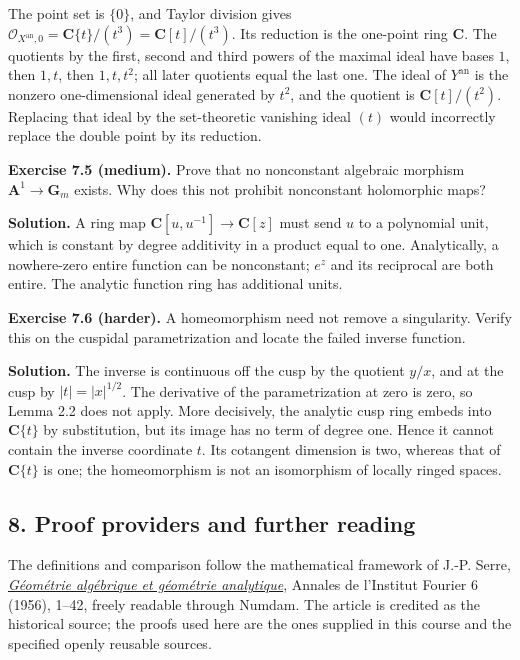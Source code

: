 \documentclass[11pt]{article}
\begin{document}
The point set is \(\{0\}\), and Taylor division gives
\(\mathcal O_{X^{\mathrm{an}},0}=\mathbf C\{t\}/(t^3)=\mathbf C[t]/(t^3)\).
Its reduction is the one-point ring \(\mathbf C\). The quotients by the
first, second and third powers of the maximal ideal have bases \(1\),
then \(1,t\), then \(1,t,t^2\); all later quotients equal the last one.
The ideal of \(Y^{\mathrm{an}}\) is the nonzero one-dimensional ideal
generated by \(t^2\), and the quotient is \(\mathbf C[t]/(t^2)\).
Replacing that ideal by the set-theoretic vanishing ideal \((t)\) would
incorrectly replace the double point by its reduction.

\textbf{Exercise 7.5 (medium).} Prove that no nonconstant algebraic
morphism \(\mathbf A^1\to\mathbf G_m\) exists. Why does this not
prohibit nonconstant holomorphic maps?

\textbf{Solution.} A ring map \(\mathbf C[u,u^{-1}]\to\mathbf C[z]\)
must send \(u\) to a polynomial unit, which is constant by degree
additivity in a product equal to one. Analytically, a nowhere-zero
entire function can be nonconstant; \(e^z\) and its reciprocal are both
entire. The analytic function ring has additional units.

\textbf{Exercise 7.6 (harder).} A homeomorphism need not remove a
singularity. Verify this on the cuspidal parametrization and locate the
failed inverse function.

\textbf{Solution.} The inverse is continuous off the cusp by the
quotient \(y/x\), and at the cusp by \(|t|=|x|^{1/2}\). The derivative
of the parametrization at zero is zero, so Lemma 2.2 does not apply.
More decisively, the analytic cusp ring embeds into \(\mathbf C\{t\}\)
by substitution, but its image has no term of degree one. Hence it
cannot contain the inverse coordinate \(t\). Its cotangent dimension is
two, whereas that of \(\mathbf C\{t\}\) is one; the homeomorphism is not
an isomorphism of locally ringed spaces.

\subsection{8. Proof providers and further
reading}\label{proof-providers-and-further-reading}

The definitions and comparison follow the mathematical framework of
J.-P. Serre,
\href{https://www.numdam.org/item/AIF_1956__6__1_0/}{\emph{Géométrie
algébrique et géométrie analytique}}, Annales de l'Institut Fourier 6
(1956), 1--42, freely readable through Numdam. The article is credited
as the historical source; the proofs used here are the ones supplied in
this course and the specified openly reusable sources.
\end{document}
